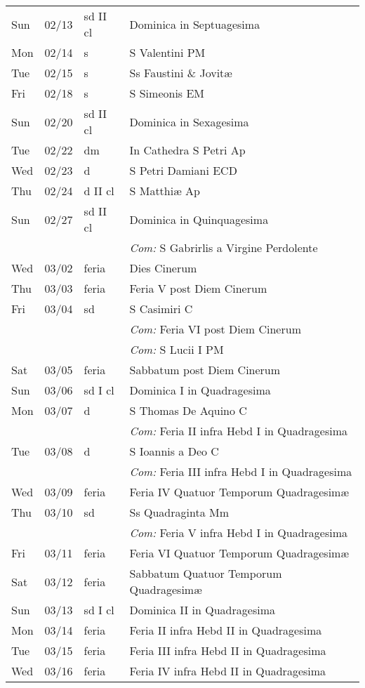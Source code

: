 \documentclass[10pt]{article}
\begin{document}
\begin{longtable}{ l l l l }
Sun & 02/13 & sd II cl & Dominica in Septuagesima\\
Mon & 02/14 & s & S Valentini PM\\
Tue & 02/15 & s & Ss Faustini \& Jovitæ\\
Fri & 02/18 & s & S Simeonis EM\\
Sun & 02/20 & sd II cl & Dominica in Sexagesima\\
Tue & 02/22 & dm & In Cathedra S Petri Ap\\
Wed & 02/23 & d & S Petri Damiani ECD\\
Thu & 02/24 & d II cl & S Matthiæ Ap\\
Sun & 02/27 & sd II cl & Dominica in Quinquagesima\\
 & & & \textit{Com:} S Gabrirlis a Virgine Perdolente\\
Wed & 03/02 & feria & Dies Cinerum\\
Thu & 03/03 & feria & Feria V post Diem Cinerum\\
Fri & 03/04 & sd & S Casimiri C\\
 & & & \textit{Com:} Feria VI post Diem Cinerum\\
 & & & \textit{Com:} S Lucii I PM\\
Sat & 03/05 & feria & Sabbatum post Diem Cinerum\\
Sun & 03/06 & sd I cl & Dominica I in Quadragesima\\
Mon & 03/07 & d & S Thomas De Aquino C\\
 & & & \textit{Com:} Feria II infra Hebd I in Quadragesima\\
Tue & 03/08 & d & S Ioannis a Deo C\\
 & & & \textit{Com:} Feria III infra Hebd I in Quadragesima\\
Wed & 03/09 & feria & Feria IV Quatuor Temporum Quadragesimæ\\
Thu & 03/10 & sd & Ss Quadraginta Mm\\
 & & & \textit{Com:} Feria V infra Hebd I in Quadragesima\\
Fri & 03/11 & feria & Feria VI Quatuor Temporum Quadragesimæ\\
Sat & 03/12 & feria & Sabbatum Quatuor Temporum Quadragesimæ\\
Sun & 03/13 & sd I cl & Dominica II in Quadragesima\\
Mon & 03/14 & feria & Feria II infra Hebd II in Quadragesima\\
Tue & 03/15 & feria & Feria III infra Hebd II in Quadragesima\\
Wed & 03/16 & feria & Feria IV infra Hebd II in Quadragesima\\

\end{longtable}
\end{document}
